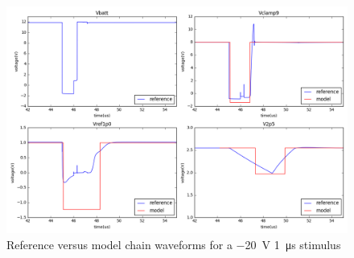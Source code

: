 \begin{figure}[!h]
  \centering
  \includegraphics[width=\textwidth]{src/4/figures/total_simulation_20V_1u_V2.png}
  \caption{Reference versus model chain waveforms for a \SI{-20}{\volt} \SI{1}{\micro\second} stimulus}
  \label{fig:reference_simu_v2_20V_100n}
\end{figure}
